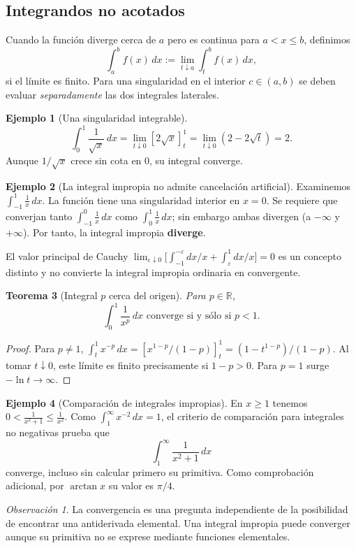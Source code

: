 \documentclass[12pt]{article}
\newtheorem{teorema}{Teorema}[section]
\theoremstyle{definition}
\newtheorem{ejemplo}[teorema]{Ejemplo}
\theoremstyle{remark}
\newtheorem*{observacion}{Observación}
\newcommand{\R}{\mathbb{R}}
\newcommand{\dd}{\,dx}
\begin{document}
\subsection*{Integrandos no acotados}
Cuando la función diverge cerca de $a$ pero es continua para $a<x\le b$, definimos
\[\int_a^b f(x)\dd:=\lim_{t\downarrow a}\int_t^b f(x)\dd,\]
si el límite es finito. Para una singularidad en el interior $c\in(a,b)$ se deben evaluar \emph{separadamente} las dos integrales laterales.
\begin{ejemplo}[Una singularidad integrable]
\[\int_0^1\frac1{\sqrt{x}}\dd
=\lim_{t\downarrow0}\left[2\sqrt x\right]_t^1
=\lim_{t\downarrow0}(2-2\sqrt t)=\boxed{2}.\]
Aunque $1/\sqrt x$ crece sin cota en $0$, su integral converge.
\end{ejemplo}
\begin{ejemplo}[La integral impropia no admite cancelación artificial]
Examinemos $\int_{-1}^1\frac1x\dd$. La función tiene una singularidad interior en $x=0$. Se requiere que converjan tanto $\int_{-1}^0\frac1x\dd$ como $\int_0^1\frac1x\dd$; sin embargo ambas divergen (a $-\infty$ y $+\infty$). Por tanto, la integral impropia \textbf{diverge}.

El valor principal de Cauchy $\lim_{\varepsilon\downarrow0}\bigl[\int_{-1}^{-\varepsilon}\!dx/x+\int_{\varepsilon}^1\!dx/x\bigr]=0$ es un concepto distinto y no convierte la integral impropia ordinaria en convergente.
\end{ejemplo}
\begin{teorema}[Integral $p$ cerca del origen]
Para $p\in\R$,
\[\boxed{\int_0^1\frac{1}{x^p}\dd\text{ converge si y sólo si }p<1.}\]
\end{teorema}
\begin{proof}
Para $p\ne1$, $\int_t^1x^{-p}\dd=[x^{1-p}/(1-p)]_t^1=(1-t^{1-p})/(1-p)$. Al tomar $t\downarrow0$, este límite es finito precisamente si $1-p>0$. Para $p=1$ surge $-\ln t\to\infty$.
\end{proof}
\begin{ejemplo}[Comparación de integrales impropias]
En $x\ge1$ tenemos $0<\frac1{x^2+1}\le\frac1{x^2}$. Como $\int_1^\infty x^{-2}\dd=1$, el criterio de comparación para integrales no negativas prueba que
\[\int_1^\infty\frac{1}{x^2+1}\dd\]
converge, incluso sin calcular primero su primitiva. Como comprobación adicional, por $\arctan x$ su valor es $\pi/4$.
\end{ejemplo}
\begin{observacion}
La convergencia es una pregunta independiente de la posibilidad de encontrar una antiderivada elemental. Una integral impropia puede converger aunque su primitiva no se exprese mediante funciones elementales.
\end{observacion}
\end{document}

